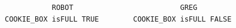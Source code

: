\documentclass[a4paper,11pt,twoside]{StyleThese}
\begin{document}
\begin{itemize}
\begin{scriptsize}
\begin{verbatim}
           ROBOT                         GREG
COOKIE_BOX isFULL TRUE        COOKIE_BOX isFULL FALSE
\end{verbatim}
\end{scriptsize}
\end{itemize}











\end{document}
